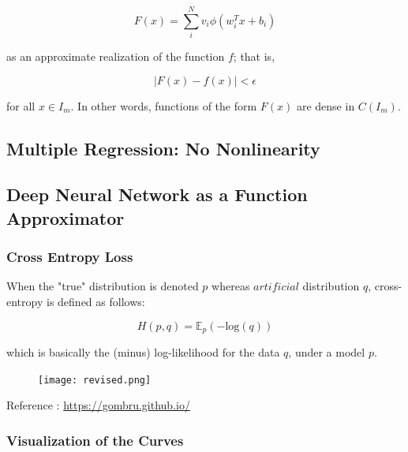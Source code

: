 \documentclass[12pt]{article}
\begin{document}
$$
F(x) = \sum_i^N v_i \phi(w_i^T x + b_i)
$$

as an approximate realization of the function $f$; that is,

$$
 | F(x) - f (x) | < \epsilon
$$

for all $x \in I_m$. In other words, functions of the form $F(x)$ are dense in $C(I_m)$.


\subsection{Multiple Regression: No Nonlinearity}


\subsection{Deep Neural Network as a Function Approximator}


\subsubsection*{Cross Entropy Loss}

When the "true" distribution is denoted $p$ whereas $artificial$ distribution $q$, cross-entropy is defined as follows:

$$
H(p,q) = \mathbb{E}_p (- \mathrm{log} (q) )
$$

which is basically the (minus) log-likelihood for the data $q$, under a model $p$.


\begin{figure}[h!]
  \centering
  \texttt{[image: revised.png]}
\end{figure}

Reference : \url{https://gombru.github.io/}


\subsubsection*{Visualization of the Curves}
\end{document}
